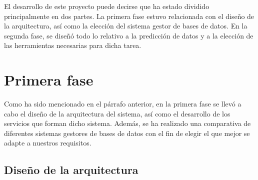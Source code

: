 

El desarrollo de este proyecto puede decirse que ha estado dividido principalmente en dos partes. La primera
fase estuvo relacionada con el diseño de la arquitectura, así como la elección del sistema gestor de bases de
datos. En la segunda fase, se diseñó todo lo relativo a la predicción de datos y a la elección de las
herramientas necesarias para dicha tarea.

\section{Primera fase}

Como ha sido mencionado en el párrafo anterior, en la primera fase se llevó a cabo el diseño de la
arquitectura del sistema, así como el desarrollo de los servicios que forman dicho sistema. Además,
se ha realizado una comparativa de diferentes sistemas gestores de bases de datos con el fin de elegir
el que mejor se adapte a nuestros requisitos.


\subsection{Diseño de la arquitectura}

